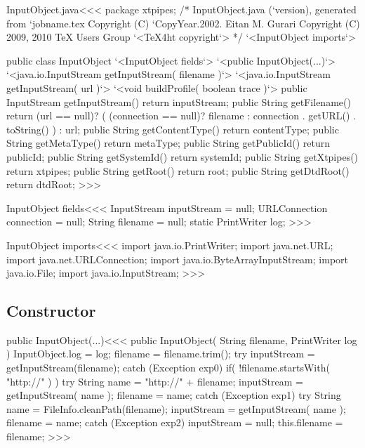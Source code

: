 \documentclass{article}
\begin{document}


\<InputObject.java\><<<
package xtpipes;
/* InputObject.java (`version), generated from `jobname.tex
   Copyright (C) `CopyYear.2002. Eitan M. Gurari
   Copyright (C) 2009, 2010 TeX Users Group
`<TeX4ht copyright`> */
`<InputObject imports`>

public class InputObject{
      `<InputObject fields`>
   `<public InputObject(...)`>
   `<java.io.InputStream getInputStream( filename )`>
   `<java.io.InputStream getInputStream( url )`>
   `<void buildProfile( boolean trace )`>
   public InputStream getInputStream(){ return inputStream; }
   public String getFilename(){
      return (url == null)?
         ( (connection == null)? filename
                               :
                                 connection . getURL() . toString()
         )
       : url;
   }
   public String getContentType(){ return contentType; }
   public String getMetaType(){ return metaType; }
   public String getPublicId(){ return publicId; }
   public String getSystemId(){ return systemId; }
   public String getXtpipes(){ return xtpipes; }
   public String getRoot(){ return root; }
   public String getDtdRoot(){ return dtdRoot; }
}
>>>

\<InputObject fields\><<<
InputStream inputStream = null;
URLConnection connection = null;
String filename = null;
static PrintWriter log;
>>>

\<InputObject imports\><<<
import java.io.PrintWriter;
import java.net.URL;
import java.net.URLConnection;
import java.io.ByteArrayInputStream;
import java.io.File;
import java.io.InputStream;
>>>

\subsection{Constructor}




\<public InputObject(...)\><<<
public InputObject( String filename, PrintWriter log ){
   InputObject.log = log;
   filename = filename.trim();
   try{
      inputStream = getInputStream(filename);
   } catch (Exception exp0){
      if( !filename.startsWith( "http://" ) ){
         try{
            String name = "http://" + filename;
            inputStream = getInputStream( name );
            filename = name;
         } catch (Exception exp1){
            try{
               String name = FileInfo.cleanPath(filename);
               inputStream = getInputStream( name );
               filename = name;
            } catch (Exception exp2){ inputStream = null; }
   }  }  }
   this.filename = filename;
}
>>>
\end{document}
